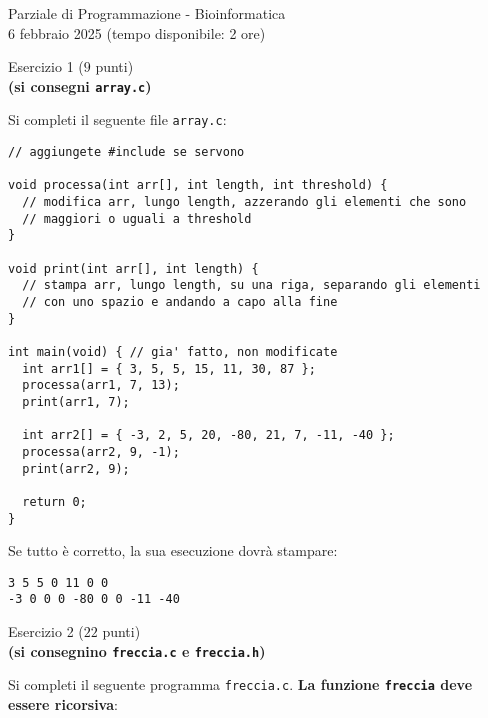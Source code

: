 \documentclass[12pt]{article}
\begin{document}
\begin{center}{\LARGE Parziale di Programmazione - Bioinformatica}\\
  \large 6 febbraio 2025 (tempo disponibile: 2 ore)
\end{center}

\vspace*{1ex}
\begin{center}{\Large Esercizio 1} ($9$ punti)\\
  \textbf{(si consegni \texttt{array.c})}
\end{center}

Si completi il seguente file \texttt{array.c}:

\begin{center}
\begin{lstlisting}[language=myC]
// aggiungete #include se servono

void processa(int arr[], int length, int threshold) {
  // modifica arr, lungo length, azzerando gli elementi che sono
  // maggiori o uguali a threshold
}

void print(int arr[], int length) {
  // stampa arr, lungo length, su una riga, separando gli elementi
  // con uno spazio e andando a capo alla fine
}

int main(void) { // gia' fatto, non modificate
  int arr1[] = { 3, 5, 5, 15, 11, 30, 87 };
  processa(arr1, 7, 13);
  print(arr1, 7);

  int arr2[] = { -3, 2, 5, 20, -80, 21, 7, -11, -40 };
  processa(arr2, 9, -1);
  print(arr2, 9);

  return 0;
}
\end{lstlisting}
\end{center}
%
Se tutto \`e corretto, la sua esecuzione dovr\`a stampare:

\begin{mdframed}[backgroundcolor=lightgrey] 
\begin{verbatim}
3 5 5 0 11 0 0 
-3 0 0 0 -80 0 0 -11 -40 
\end{verbatim}
\end{mdframed}

\newpage
\begin{center}
  {\Large Esercizio 2} ($22$ punti)\\
  \textbf{(si consegnino \texttt{freccia.c} e \texttt{freccia.h})}
\end{center}

Si completi il seguente programma \texttt{freccia.c}.
\textbf{La funzione \texttt{freccia} deve essere ricorsiva}:
\end{document}
